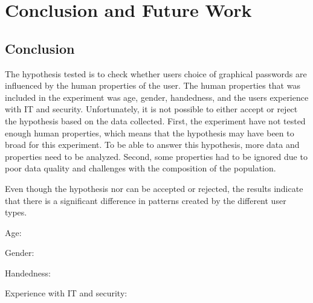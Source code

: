 \chapter{Conclusion and Future Work}\label{chap:conclusion}

  \section{Conclusion}
    
    The hypothesis tested is to check whether users choice of graphical passwords are influenced by the human properties of the user. The human properties that was included in the experiment was age, gender, handedness, and the users experience with IT and security. 
    Unfortunately, it is not possible to either accept or reject the hypothesis based on the data collected. First, the experiment have not tested enough human properties, which means that the hypothesis may have been to broad for this experiment. To be able to answer this hypothesis, more data and properties need to be analyzed. Second, some properties had to be ignored due to poor data quality and challenges with the composition of the population.

    Even though the hypothesis nor can be accepted or rejected, the results indicate that there is a significant difference in patterns created by the different user types. 


    Age: 

    Gender:

    Handedness:

    Experience with IT and security:




